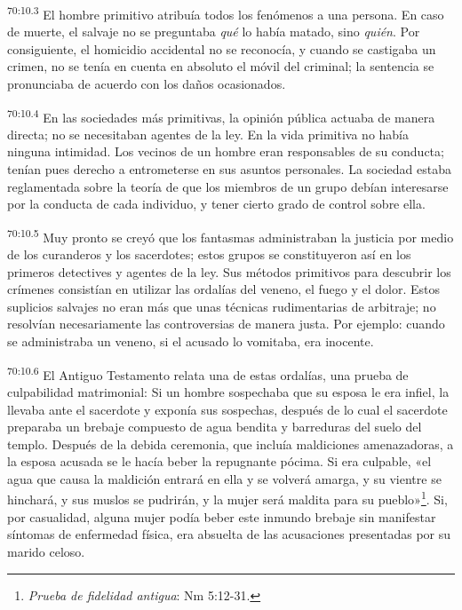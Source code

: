 \par
\textsuperscript{70:10.3} El hombre primitivo atribuía todos los fenómenos a una persona. En caso de muerte, el salvaje no se preguntaba \textit{qué} lo había matado, sino \textit{quién}. Por consiguiente, el homicidio accidental no se reconocía, y cuando se castigaba un crimen, no se tenía en cuenta en absoluto el móvil del criminal; la sentencia se pronunciaba de acuerdo con los daños ocasionados.

\par
\textsuperscript{70:10.4} En las sociedades más primitivas, la opinión pública actuaba de manera directa; no se necesitaban agentes de la ley. En la vida primitiva no había ninguna intimidad. Los vecinos de un hombre eran responsables de su conducta; tenían pues derecho a entrometerse en sus asuntos personales. La sociedad estaba reglamentada sobre la teoría de que los miembros de un grupo debían interesarse por la conducta de cada individuo, y tener cierto grado de control sobre ella.

\par
\textsuperscript{70:10.5} Muy pronto se creyó que los fantasmas administraban la justicia por medio de los curanderos y los sacerdotes; estos grupos se constituyeron así en los primeros detectives y agentes de la ley. Sus métodos primitivos para descubrir los crímenes consistían en utilizar las ordalías del veneno, el fuego y el dolor. Estos suplicios salvajes no eran más que unas técnicas rudimentarias de arbitraje; no resolvían necesariamente las controversias de manera justa. Por ejemplo: cuando se administraba un veneno, si el acusado lo vomitaba, era inocente.

\par
\textsuperscript{70:10.6} El Antiguo Testamento relata una de estas ordalías, una prueba de culpabilidad matrimonial: Si un hombre sospechaba que su esposa le era infiel, la llevaba ante el sacerdote y exponía sus sospechas, después de lo cual el sacerdote preparaba un brebaje compuesto de agua bendita y barreduras del suelo del templo. Después de la debida ceremonia, que incluía maldiciones amenazadoras, a la esposa acusada se le hacía beber la repugnante pócima. Si era culpable, «el agua que causa la maldición entrará en ella y se volverá amarga, y su vientre se hinchará, y sus muslos se pudrirán, y la mujer será maldita para su pueblo»\footnote{\textit{Prueba de fidelidad antigua}: Nm 5:12-31.}. Si, por casualidad, alguna mujer podía beber este inmundo brebaje sin manifestar síntomas de enfermedad física, era absuelta de las acusaciones presentadas por su marido celoso.

